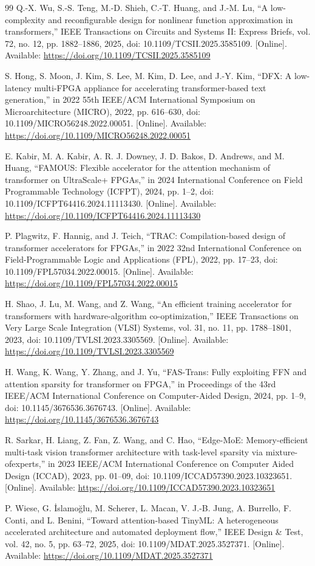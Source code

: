 \documentclass[journal]{IEEEtran}
\def\SMUurlG{https://doi.org/10.1109/TCSII.2025.3585109}
\def\SMUurlH{https://doi.org/10.1109/MICRO56248.2022.00051}
\def\SMUurlI{https://doi.org/10.1109/ICFPT64416.2024.11113430}
\def\SMUurlJ{https://doi.org/10.1109/FPL57034.2022.00015}
\def\SMUurlK{https://doi.org/10.1109/TVLSI.2023.3305569}
\def\SMUurlL{https://doi.org/10.1145/3676536.3676743}
\def\SMUurlM{https://doi.org/10.1109/ICCAD57390.2023.10323651}
\def\SMUurlN{https://doi.org/10.1109/MDAT.2025.3527371}
\begin{document}
\begin{thebibliography}{99}
 Q.-X. Wu, S.-S. Teng, M.-D. Shieh, C.-T. Huang, and J.-M. Lu, “A
low-complexity and reconfigurable design for nonlinear function approximation in
transformers,” IEEE Transactions on Circuits and Systems II: Express Briefs, vol. 72, no.
12, pp. 1882–1886, 2025, doi: 10.1109/TCSII.2025.3585109. [Online]. Available:
\expandafter\url\expandafter{\SMUurlG}

 S. Hong, S. Moon, J. Kim, S. Lee, M. Kim, D. Lee, and J.-Y. Kim, “DFX: A
low-latency multi-FPGA appliance for accelerating transformer-based text generation,” in
2022 55th IEEE/ACM International Symposium on Microarchitecture (MICRO), 2022, pp.
616–630, doi: 10.1109/MICRO56248.2022.00051. [Online]. Available:
\expandafter\url\expandafter{\SMUurlH}

 E. Kabir, M. A. Kabir, A. R. J. Downey, J. D. Bakos, D. Andrews, and M.
Huang, “FAMOUS: Flexible accelerator for the attention mechanism of transformer on
UltraScale+ FPGAs,” in 2024 International Conference on Field Programmable Technology
(ICFPT), 2024, pp. 1–2, doi: 10.1109/ICFPT64416.2024.11113430. [Online]. Available:
\expandafter\url\expandafter{\SMUurlI}

 P. Plagwitz, F. Hannig, and J. Teich, “TRAC: Compilation-based design of
transformer accelerators for FPGAs,” in 2022 32nd International Conference on
Field-Programmable Logic and Applications (FPL), 2022, pp. 17–23, doi:
10.1109/FPL57034.2022.00015. [Online]. Available:
\expandafter\url\expandafter{\SMUurlJ}

 H. Shao, J. Lu, M. Wang, and Z. Wang, “An efficient training accelerator
for transformers with hardware-algorithm co-optimization,” IEEE Transactions on Very Large
Scale Integration (VLSI) Systems, vol. 31, no. 11, pp. 1788–1801, 2023, doi:
10.1109/TVLSI.2023.3305569. [Online]. Available:
\expandafter\url\expandafter{\SMUurlK}

 H. Wang, K. Wang, Y. Zhang, and J. Yu, “FAS-Trans: Fully exploiting FFN
and attention sparsity for transformer on FPGA,” in Proceedings of the 43rd IEEE/ACM
International Conference on Computer-Aided Design, 2024, pp. 1–9, doi:
10.1145/3676536.3676743. [Online]. Available: \expandafter\url\expandafter{\SMUurlL}

 R. Sarkar, H. Liang, Z. Fan, Z. Wang, and C. Hao, “Edge-MoE:
Memory-efficient multi-task vision transformer architecture with task-level sparsity via
mixture-ofexperts,” in 2023 IEEE/ACM International Conference on Computer Aided Design
(ICCAD), 2023, pp. 01–09, doi: 10.1109/ICCAD57390.2023.10323651. [Online]. Available:
\expandafter\url\expandafter{\SMUurlM}

 P. Wiese, G. İslamoğlu, M. Scherer, L. Macan, V. J.-B. Jung, A. Burrello,
F. Conti, and L. Benini, “Toward attention-based TinyML: A heterogeneous accelerated
architecture and automated deployment flow,” IEEE Design \& Test, vol. 42, no. 5, pp.
63–72, 2025, doi: 10.1109/MDAT.2025.3527371. [Online]. Available:
\expandafter\url\expandafter{\SMUurlN}

\end{thebibliography}
\end{document}
